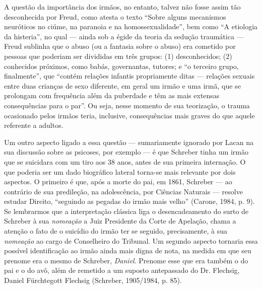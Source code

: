 A questão da importância dos irmãos, no entanto, talvez não fosse assim
tão desconhecida por Freud, como atesta o texto ``Sobre alguns
mecanismos neuróticos no ciúme, na paranoia e na homossexualidade'',
bem como ``A etiologia da histeria'', no qual --- ainda sob a égide da
teoria da sedução traumática --- Freud sublinha que o abuso (ou a
fantasia sobre o abuso) era cometido por pessoas que poderiam ser
divididas em três grupos: (1) desconhecidos; (2) conhecidos próximos,
como babás, governantas, tutores; e ``o terceiro grupo, finalmente'',
que ``contém relações infantis propriamente ditas --- relações sexuais
entre duas crianças de sexo diferente, em geral um irmão e uma irmã, que
se prolongam com frequência além da puberdade e têm as mais extensas
consequências para o par''. Ou seja, nesse momento de sua teorização, o
trauma ocasionado pelos irmãos teria, inclusive, consequências mais
graves do que aquele referente a adultos.

Um outro aspecto ligado a essa questão --- sumariamente ignorado por
Lacan na sua discussão sobre as psicoses, por exemplo --- é que Schreber
tinha um irmão que se suicidara com um tiro aos 38 anos, antes de sua
primeira internação. O que poderia ser um dado biográfico lateral
torna-se mais relevante por dois aspectos. O primeiro é que, após a
morte do pai, em 1861, Schreber --- ao contrário de sua predileção, na
adolescência, por Ciências Naturais --- resolve estudar Direito,
``seguindo as pegadas do irmão mais velho'' (Carone, 1984, p. 9). Se
lembrarmos que a interpretação clássica liga o desencadeamento do surto
de Schreber à sua \emph{nomeação} a Juiz Presidente da Corte de
Apelação, chama a atenção o fato de o suicídio do irmão ter se seguido,
precisamente, à sua \emph{nomeação} ao cargo de Conselheiro do Tribunal.
Um segundo aspecto tornaria essa possível identificação ao irmão ainda
mais digna de nota, na medida em que seu prenome era o mesmo de
Schreber, \emph{Daniel}. Prenome esse que era também o do pai e o do
avô, além de remetido a um suposto antepassado do Dr. Flechsig, Daniel
Fürchtegott Flechsig (Schreber, 1905/1984, p. 85).

